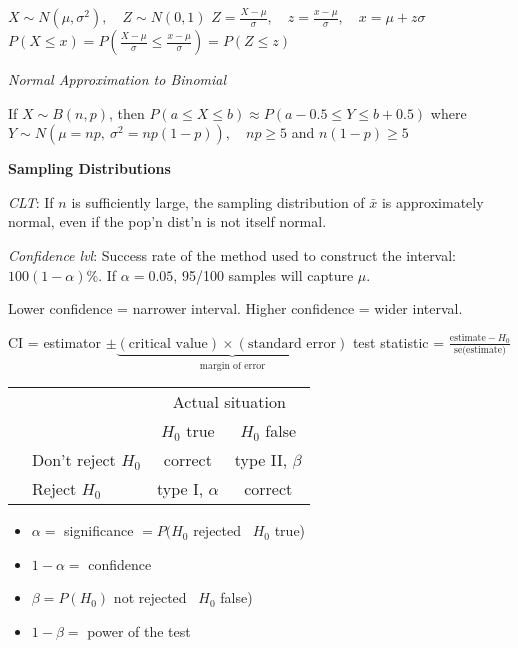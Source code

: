 \documentclass[twocolumn]{article}
\begin{document}
$X \sim N(\mu, \sigma^2), \quad Z \sim N(0, 1)$ \hfill $Z = \frac{X-\mu}{\sigma}, \quad z = \frac{x - \mu}{\sigma}, \quad x = \mu + z \sigma$ \hfill $P(X \leq x) = P\left( \frac{X-\mu}{\sigma} \leq \frac{x - \mu}{\sigma} \right) = P(Z \leq z)$

\textit{Normal Approximation to Binomial}

If $X \sim B(n, p)$, then $P(a \leq X \leq b) \approx P(a - 0.5 \leq Y \leq b + 0.5)$ \hfill where $Y \sim N \left(\mu = np,\ \sigma^2 = np(1-p) \right), \quad np \geq 5$ and $n(1-p) \geq 5$

\vspace{-.5em}
\dotfill

\textbf{Sampling Distributions}

\textit{CLT}: If $n$ is sufficiently large, the sampling distribution of $\bar{x}$ is approximately normal, even if the pop'n dist'n is not itself normal.

\textit{Confidence lvl}: Success rate of the method used to construct the interval: $100(1-\alpha)\%$. If $\alpha = 0.05$, 95/100 samples will capture $\mu$.

Lower confidence = narrower interval. Higher confidence = wider interval.

CI = estimator $\pm \underbrace{(\text{critical value}) \times (\text{standard error})}_{\text{margin of error}}$ \hfill test statistic = $\frac{\text{estimate} - H_0}{\text{se(estimate)}}$

\begin{minipage}[t]{.5\textwidth}
    \centering
    \begin{tabular}{l|lcc}
        \toprule
        \multirow{2}{*}{} &                        & \multicolumn{2}{c}{Actual situation}                  \\ \cline{2-4} 
                        & \multicolumn{1}{l|}{}  & \multicolumn{1}{c|}{$H_0$ true}                     & $H_0$ false       \\ \cline{2-4} 
        \rotatebox[origin=c]{90}{\parbox[c]{1cm}{\centering Decision}} & \multicolumn{1}{l|}{Don't reject $H_0$} & \multicolumn{1}{c|}{correct} & type II, $\beta$ \\ \cline{2-4}
                        & \multicolumn{1}{l|}{Reject $H_0$} & \multicolumn{1}{c|}{type I, $\alpha$} & correct \\
        \bottomrule
    \end{tabular}
\end{minipage}
\hfill
\begin{minipage}[t]{.48\textwidth}
    \vspace{-4em}
    \begin{itemize}
        \item $\alpha =$ significance $= P(H_0$ rejected \textbar\ $H_0$ true)
        \item $1 - \alpha =$ confidence
        \item $\beta = P(H_0)$ not rejected \textbar\ $H_0$ false)
        \item $1 - \beta =$ power of the test
    \end{itemize}
\end{minipage}
\end{document}
